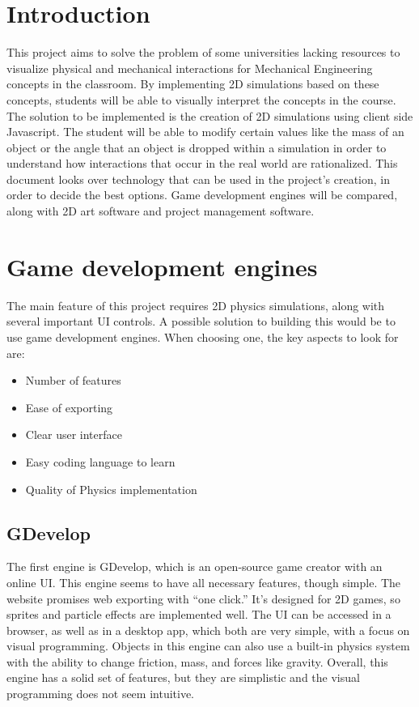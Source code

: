 \documentclass[capstone.tex]{subfiles}
\begin{document}
\section{Introduction}
This project aims to solve the problem of some universities lacking resources to visualize physical and mechanical interactions for Mechanical Engineering concepts in the classroom. By implementing 2D simulations based on these concepts, students will be able to visually interpret the concepts in the course. The solution to be implemented is the creation of 2D simulations using client side Javascript. The student will be able to modify certain values like the mass of an object or the angle that an object is dropped within a simulation in order to understand how interactions that occur in the real world are rationalized. This document looks over technology that can be used in the project's creation, in order to decide the best options. Game development engines will be compared, along with 2D art software and project management software.
\section{Game development engines}
The main feature of this project requires 2D physics simulations, along with several important UI controls. A possible solution to building this would be to use game development engines. When choosing one, the key aspects to look for are:
\begin{itemize}
    \item Number of features
    \item Ease of exporting
    \item Clear user interface
    \item Easy coding language to learn
    \item Quality of Physics implementation
\end{itemize}

\subsection{GDevelop}
The first engine is GDevelop, which is an open-source game creator with an online UI. This engine seems to have all necessary features, though simple. The website promises web exporting with “one click.” It’s designed for 2D games, so sprites and particle effects are implemented well. The UI can be accessed in a browser, as well as in a desktop app, which both are very simple, with a focus on visual programming. Objects in this engine can also use a built-in physics system with the ability to change friction, mass, and forces like gravity. Overall, this engine has a solid set of features, but they are simplistic and the visual programming does not seem intuitive. \cite{gdevelop}
\end{document}
